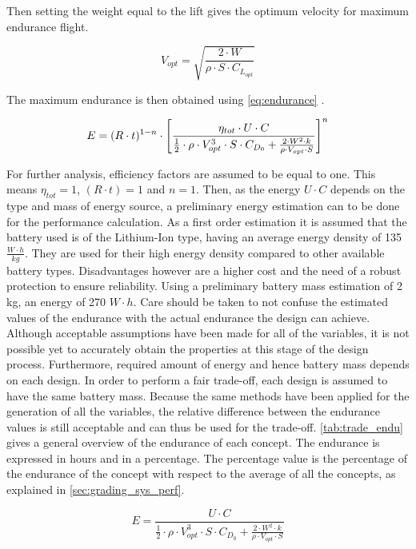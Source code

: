Then setting the weight equal to the lift gives the optimum velocity for maximum endurance flight.

\begin{equation}
    V_{opt} = \sqrt{\frac{2\cdot W}{\rho\cdot S\cdot C_{L_{opt}}}}
    \label{eq:vopt}
\end{equation}

The maximum endurance is then obtained using \autoref{eq:endurance} \cite{ran_end}.

\begin{equation}
    E = (R\cdot t)^{1-n}\cdot \Bigg{[}\frac{\eta_{tot}\cdot U\cdot C}{\frac{1}{2}\cdot\rho \cdot V_{opt}^3\cdot S\cdot C_{D_0} + \frac{2\cdot W^2\cdot k}{\rho\cdot V_{opt}\cdot S}}\Bigg{]}^n
    \label{eq:endurance}
\end{equation}

For further analysis, efficiency factors are assumed to be equal to one. This means $\eta_{tot}=1$, $(R\cdot t)=1$ and $n=1$. Then, as the energy $U\cdot C$ depends on the type and mass of energy source, a preliminary energy estimation can to be done for the performance calculation. As a first order estimation it is assumed that the battery used is of the Lithium-Ion type, having an average energy density of 135 $\frac{W\cdot h}{kg}$. They are used for their high energy density compared to other available battery types. Disadvantages however are a higher cost and the need of a robust protection to ensure reliability. Using a preliminary battery mass estimation of 2 kg, an energy of 270 $W\cdot h$. Care should be taken to not confuse the estimated values of the endurance with the actual endurance the design can achieve. Although acceptable assumptions have been made for all of the variables, it is not possible yet to accurately obtain the properties at this stage of the design process. Furthermore, required amount of energy and hence battery mass depends on each design. In order to perform a fair trade-off, each design is assumed to have the same battery mass. Because the same methods have been applied for the generation of all the variables, the relative difference between the endurance values is still acceptable and can thus be used for the trade-off. \autoref{tab:trade_endu} gives a general overview of the endurance of each concept. The endurance is expressed in hours and in a percentage. The percentage value is the percentage of the endurance of the concept with respect to the average of all the concepts, as explained in \autoref{sec:grading_sys_perf}.

\begin{equation}
    E =  \frac{U\cdot C}{\frac{1}{2}\cdot \rho\cdot V_{opt}^3\cdot S\cdot C_{D_0} + \frac{2\cdot W^2\cdot k}{\rho \cdot V_{opt}\cdot S}}
    \label{eq:endurance_simpl}
\end{equation}

